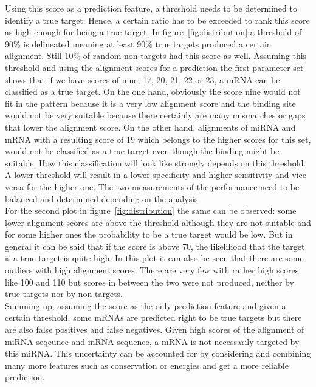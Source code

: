 \documentclass[11pt, a4paper, oneside]{book}
\begin{document}
Using this score as a prediction feature, a threshold needs to be determined to identify a true target. Hence, a certain ratio has to be exceeded to rank this score as high enough for being a true target. In figure~\ref{fig:distribution} a threshold of 90\% is delineated meaning at least 90\% true targets produced a certain alignment. Still 10\% of random non-targets had this score as well. Assuming this threshold and using the alignment scores for a prediction the first parameter set shows that if we have scores of nine, 17, 20, 21, 22 or 23, a mRNA can be classified as a true target. On the one hand, obviously the score nine would not fit in the pattern because it is a very low alignment score and the binding site would not be very suitable because there certainly are many mismatches or gaps that lower the alignment score. On the other hand, alignments of miRNA and mRNA with a resulting score of 19 which belongs to the higher scores for this set, would not be classified as a true target even though the binding might be suitable. How this classification will look like strongly depends on this threshold. A lower threshold will result in a lower specificity and higher sensitivity and vice versa for the higher one. The two measurements of the performance need to be balanced and determined depending on the analysis. \\

For the second plot in figure~\ref{fig:distribution} the same can be observed: some lower alignment scores are above the threshold although they are not suitable and for some higher ones the probability to be a true target would be low. But in general it can be said that if the score is above 70, the likelihood that the target is a true target is quite high. In this plot it can also be seen that there are some outliers with high alignment scores. There are very few with rather high scores like 100 and 110 but scores in between the two were not produced, neither by true targets nor by non-targets.  \\

Summing up, assuming the score as the only prediction feature and given a certain threshold, some mRNAs are predicted right to be true targets but there are also false positives and false negatives. Given high scores of the alignment of miRNA seqeunce and mRNA sequence, a mRNA is not necessarily targeted by this miRNA. This uncertainty can be accounted for by considering and combining many more features such as conservation or energies and get a more reliable prediction.\\
\end{document}
